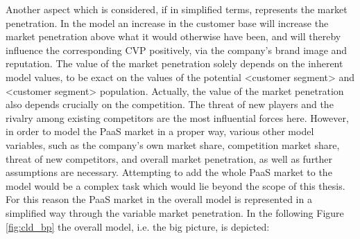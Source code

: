 Another aspect which is considered, if in simplified terms, represents the market penetration. In the model an increase in the customer base will increase the market penetration above what it would otherwise have been, and will thereby influence the corresponding \ac{CVP} positively, via the company's brand image and reputation. The value of the market penetration solely depends on the inherent model values, to be exact on the values of the potential <customer segment> and <customer segment> population. Actually, the value of the market penetration also depends crucially on the competition. The threat of new players and the rivalry among existing competitors \citep[pp. 80-82, 85-86]{Porter2008} are the most influential forces here. However, in order to model the \ac{PaaS} market in a proper way, various other model variables, such as the company's own market share, competition market share, threat of new competitors, and overall market penetration, as well as further assumptions are necessary. Attempting to add the whole \ac{PaaS} market to the model would be a complex task which would lie beyond the scope of this thesis. For this reason the \ac{PaaS} market in the overall model is represented in a simplified way through the variable market penetration. In the following Figure \ref{fig:cld_bp} the overall model, i.e. the big picture, is depicted:

\newpage




